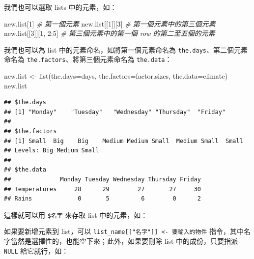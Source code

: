 \documentclass[
]{book}
\newenvironment{Shaded}{\begin{snugshade}}{\end{snugshade}}
\newcommand{\AttributeTok}[1]{\textcolor[rgb]{0.77,0.63,0.00}{#1}}
\newcommand{\CommentTok}[1]{\textcolor[rgb]{0.56,0.35,0.01}{\textit{#1}}}
\newcommand{\DecValTok}[1]{\textcolor[rgb]{0.00,0.00,0.81}{#1}}
\newcommand{\FunctionTok}[1]{\textcolor[rgb]{0.00,0.00,0.00}{#1}}
\newcommand{\NormalTok}[1]{#1}
\newcommand{\OtherTok}[1]{\textcolor[rgb]{0.56,0.35,0.01}{#1}}
\newcommand{\SpecialCharTok}[1]{\textcolor[rgb]{0.00,0.00,0.00}{#1}}
\newcommand{\StringTok}[1]{\textcolor[rgb]{0.31,0.60,0.02}{#1}}
\theoremstyle{definition}
\theoremstyle{remark}
\begin{document}
我們也可以選取 lists 中的元素，如：

\begin{Shaded}
\begin{Highlighting}[]
\NormalTok{new.list[}\DecValTok{1}\NormalTok{]  }\CommentTok{\# 第一個元素}
\NormalTok{new.list[[}\DecValTok{1}\NormalTok{]][}\DecValTok{3}\NormalTok{]  }\CommentTok{\# 第一個元素中的第三個元素}
\NormalTok{new.list[[}\DecValTok{3}\NormalTok{]][}\DecValTok{1}\NormalTok{, }\DecValTok{2}\SpecialCharTok{:}\DecValTok{5}\NormalTok{]  }\CommentTok{\# 第三個元素中的第一個 row 的第二至五個的元素}
\end{Highlighting}
\end{Shaded}

我們也可以為 list 中的元素命名，如將第一個元素命名為 \texttt{the.days}、第二個元素命名為 \texttt{the.factors}、將第三個元素命名為 \texttt{the.data}：

\begin{Shaded}
\begin{Highlighting}[]
\NormalTok{new.list }\OtherTok{\textless{}{-}} \FunctionTok{list}\NormalTok{(}\AttributeTok{the.days=}\NormalTok{days, }\AttributeTok{the.factors=}\NormalTok{factor.sizes, }\AttributeTok{the.data=}\NormalTok{climate)}
\NormalTok{new.list}
\end{Highlighting}
\end{Shaded}

\begin{verbatim}
## $the.days
## [1] "Monday"    "Tuesday"   "Wednesday" "Thursday"  "Friday"   
## 
## $the.factors
## [1] Small  Big    Big    Medium Medium Small  Medium Small  Small 
## Levels: Big Medium Small
## 
## $the.data
##              Monday Tuesday Wednesday Thursday Friday
## Temperatures     28      29        27       27     30
## Rains             0       5         6        0      2
\end{verbatim}

這樣就可以用 \texttt{\$名字} 來存取 list 中的元素，如：

\begin{Shaded}
\end{Shaded}

如果要新增元素到 list，可以 \texttt{list\_name{[}{[}"名字"{]}{]}\ \textless{}-\ 要輸入的物件} 指令，其中名字當然是選擇性的，也能空下來；此外，如果要刪除 list 中的成份，只要指派 \texttt{NULL} 給它就行，如：
\end{document}
